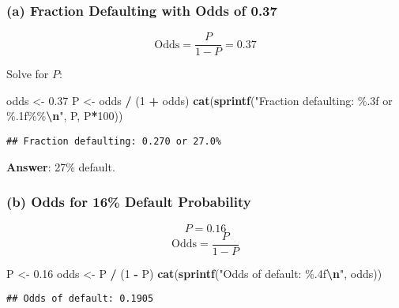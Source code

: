 \documentclass[
]{article}
\newenvironment{Shaded}{\begin{snugshade}}{\end{snugshade}}
\newcommand{\DecValTok}[1]{\textcolor[rgb]{0.00,0.00,0.81}{#1}}
\newcommand{\FloatTok}[1]{\textcolor[rgb]{0.00,0.00,0.81}{#1}}
\newcommand{\FunctionTok}[1]{\textcolor[rgb]{0.13,0.29,0.53}{\textbf{#1}}}
\newcommand{\NormalTok}[1]{#1}
\newcommand{\OtherTok}[1]{\textcolor[rgb]{0.56,0.35,0.01}{#1}}
\newcommand{\SpecialCharTok}[1]{\textcolor[rgb]{0.81,0.36,0.00}{\textbf{#1}}}
\newcommand{\StringTok}[1]{\textcolor[rgb]{0.31,0.60,0.02}{#1}}
\begin{document}
\subsubsection{(a) Fraction Defaulting with Odds of
0.37}\label{a-fraction-defaulting-with-odds-of-0.37}

\[ \text{Odds} = \frac{P}{1 - P} = 0.37 \]

Solve for \(P\):

\begin{Shaded}
\begin{Highlighting}[]
\NormalTok{odds }\OtherTok{\textless{}{-}} \FloatTok{0.37}
\NormalTok{P }\OtherTok{\textless{}{-}}\NormalTok{ odds }\SpecialCharTok{/}\NormalTok{ (}\DecValTok{1} \SpecialCharTok{+}\NormalTok{ odds)}
\FunctionTok{cat}\NormalTok{(}\FunctionTok{sprintf}\NormalTok{(}\StringTok{"Fraction defaulting: \%.3f or \%.1f\%\%}\SpecialCharTok{\textbackslash{}n}\StringTok{"}\NormalTok{, P, P}\SpecialCharTok{*}\DecValTok{100}\NormalTok{))}
\end{Highlighting}
\end{Shaded}

\begin{verbatim}
## Fraction defaulting: 0.270 or 27.0%
\end{verbatim}

\textbf{Answer}: 27\% default.

\subsubsection{(b) Odds for 16\% Default
Probability}\label{b-odds-for-16-default-probability}

\[ P = 0.16 \] \[ \text{Odds} = \frac{P}{1 - P} \]

\begin{Shaded}
\begin{Highlighting}[]
\NormalTok{P }\OtherTok{\textless{}{-}} \FloatTok{0.16}
\NormalTok{odds }\OtherTok{\textless{}{-}}\NormalTok{ P }\SpecialCharTok{/}\NormalTok{ (}\DecValTok{1} \SpecialCharTok{{-}}\NormalTok{ P)}
\FunctionTok{cat}\NormalTok{(}\FunctionTok{sprintf}\NormalTok{(}\StringTok{"Odds of default: \%.4f}\SpecialCharTok{\textbackslash{}n}\StringTok{"}\NormalTok{, odds))}
\end{Highlighting}
\end{Shaded}

\begin{verbatim}
## Odds of default: 0.1905
\end{verbatim}
\end{document}
